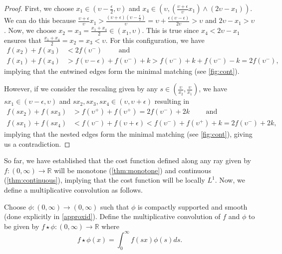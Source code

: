 \documentclass{article}
\newcommand{\eek}{\upsilon}
\begin{document}
\begin{proof}
First, we choose $x_1\in(\eek-\frac{\epsilon}{2},\eek)$ and $x_4\in \left( \eek,\left(
    \frac{\eek+\epsilon}{\eek}x_1 \right) \wedge (2\eek-x_1) \right)$. We can
    do this because $\frac{\eek+\epsilon}{\eek}x_1 >
    \frac{(\eek+\epsilon)\left(\eek-\tfrac{\epsilon}{2}\right)}{\eek} =
    \eek+\frac{\epsilon(\eek-\epsilon)}{2\eek} > \eek$ and $2\eek-x_1> \eek$.
    Now, we choose $x_2=x_3=\frac{x_1+x_4}{2} \in (x_1,\eek)$. This is
    true since $x_4< 2\eek-x_1$ ensures that $\frac{x_1+x_4}{2}
    = x_2=x_3 <\eek$.
    For this configuration, we have
    \begin{align*}
      f(x_2)+f(x_3) &< 2f(\eek^-) \qquad \mbox{ and }\\
        f(x_1)+f(x_4) &> f(\eek-\epsilon)+ f(\eek^-)+k > f(\eek^-)+k+f(\eek^-)-k =
                      2f(\eek^-),
    \end{align*}
    implying that the entwined edges form the minimal matching (see
    \cref{fig:cont}).



    However, if we consider the rescaling given by any $s\in\left(
    \frac{\eek}{x_2},\frac{\eek}{x_1} \right)$, we have $sx_1\in
  (\eek-\epsilon,\eek)$ and $sx_2,sx_3,sx_4\in (\eek,\eek+\epsilon)$ resulting
    in
    \begin{align*}
      f(sx_2)+f(sx_3)&> f(\eek^+)+f(\eek^+) = 2f(\eek^-)+2k\qquad \mbox{ and } \\
            f(sx_1)+f(sx_4) &< f(\eek^-)+f(\eek+\epsilon)<f(\eek^-)+f(\eek^+)+k =
                        2f(\eek^-)+2k,
    \end{align*}
    implying that the nested edges form the minimal matching (see
    \cref{fig:cont}), giving
    us a contradiction.
  \end{proof}



 So far, we have established that the cost function defined along any
ray given by $f:(0,\infty)\rightarrow\mathbb{R}$ will be monotone (\cref{thm:monotone}) and
continuous (\cref{thm:continuous}), implying that the cost function
will be locally $L^1$. Now, we define a multiplicative convolution as follows.

Choose $\phi:(0,\infty)\rightarrow (0,\infty)$ such that $\phi$ is
compactly supported and smooth (done explicitly in
\cref{approxid}). Define the multiplicative convolution of $f$ and
$\phi$ to be given by $f\star\phi:(0,\infty)\rightarrow
\mathbb{R}$ where
\begin{equation*}
  f\star \phi(x) = \int_0^\infty f(sx)\phi(s)ds.
\end{equation*}
\end{document}
